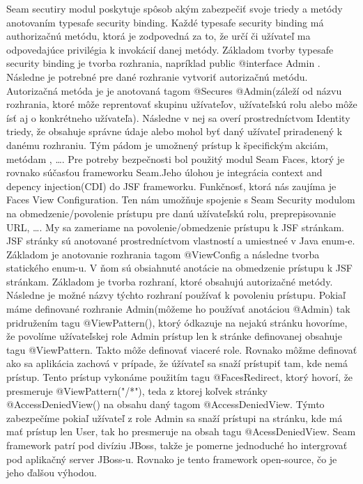 Seam secutiry modul poskytuje spôsob akým zabezpečiť svoje triedy a metódy anotovaním typesafe security binding. Každé typesafe security binding má authorizačnú metódu, ktorá je zodpovedná za to, že určí či užívateľ ma odpovedajúce privilégia k invokácií danej metódy. Základom tvorby typesafe security binding je tvorba rozhrania, napríklad public @interface Admin { }. Následne je potrebné pre dané rozhranie vytvoriť autorizačnú metódu. Autorizačná  metóda je je anotovaná tagom @Secures @Admin(záleží od názvu rozhrania, ktoré môže reprentovať skupinu užívateľov, užívateľskú rolu alebo môže ísť aj o konkrétneho užívateľa). Následne v nej sa overí prostredníctvom Identity triedy, že obsahuje správne údaje alebo mohol byť daný užívateľ priradenený k danému rozhraniu. Tým pádom je umožnený prístup k špecifickým akciám, metódam , \ldots. Pre potreby bezpečnosti bol použitý modul Seam Faces, ktorý je rovnako súčasťou frameworku Seam.Jeho úlohou je integrácia context and depency injection(CDI) do JSF frameworku. Funkčnosť, ktorá nás zaujíma je Faces View Configuration. Ten nám umožňuje spojenie s Seam Security modulom na obmedzenie/povolenie prístupu pre danú užívateľskú rolu, preprepisovanie URL, \ldots. My sa zameriame na povolenie/obmedzenie prístupu k JSF stránkam. JSF stránky sú anotované prostredníctvom vlastností a umiestneé v Java enum-e. Základom je anotovanie rozhrania tagom @ViewConfig a následne tvorba statického enum-u. V ňom sú obsiahnuté anotácie na obmedzenie prístupu k JSF stránkam. Základom je tvorba rozhraní, ktoré obsahujú autorizačné metódy. Následne je možné názvy týchto rozhraní používať k povoleniu prístupu. Pokiaľ máme definované rozhranie Admin(môžeme ho používať anotáciou @Admin) tak pridružením tagu @ViewPattern(), ktorý ódkazuje na nejakú stránku hovoríme, že povolíme užívateľskej role Admin prístup len k stránke definovanej obsahuje tagu @ViewPattern. Takto môže definovať viaceré role. Rovnako môžme definovať ako sa aplikácia zachová v prípade, že úžívateľ sa snaží prístupiť tam, kde nemá prístup. Tento prístup vykonáme použitím tagu @FacesRedirect, ktorý hovorí, že presmeruje @ViewPattern("/*"), teda z ktorej koľvek stránky @AccessDeniedView() na obsahu daný tagom @AccessDeniedView. Týmto zabezpečíme pokiaľ užívateľ z role Admin sa snaží prístupi na stránku, kde má mať prístup len User, tak ho presmeruje na obsah tagu @AcessDeniedView. Seam framework patrí pod divíziu JBoss, takže je pomerne jednoduché ho intergrovať pod aplikačný server JBoss-u. Rovnako je tento framework open-source, čo je jeho ďalšou výhodou.


